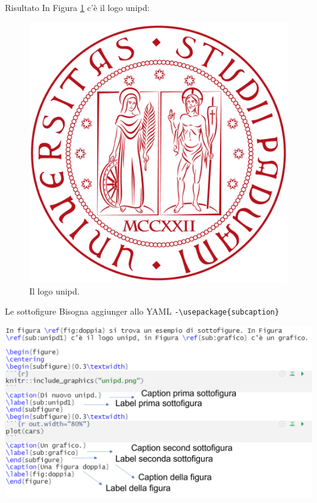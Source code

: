 \documentclass[
  ignorenonframetext,
]{beamer}
\begin{document}
\begin{frame}{Risultato}
\protect\hypertarget{risultato}{}
In Figura \ref{fig:logo} c'è il logo unipd:

\begin{figure}
\centering
\caption{Il logo unipd.}
\label{fig:logo}

\begin{center}\includegraphics[width=0.5\linewidth]{img/unipd} \end{center}
\end{figure}
\end{frame}

\begin{frame}[fragile]{Le sottofigure}
\protect\hypertarget{le-sottofigure}{}
Bisogna aggiunger allo YAML
\texttt{-\textbackslash{}usepackage\{subcaption\}}

\begin{center}\includegraphics[width=0.9\linewidth]{img/subfigure} \end{center}
\end{frame}
\end{document}
